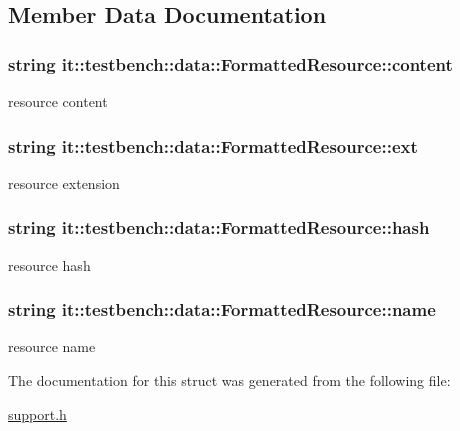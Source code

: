 \subsection{Member Data Documentation}
\hypertarget{structit_1_1testbench_1_1data_1_1FormattedResource_a911f5361ebeec67555aaafa516e0a666}{
\subsubsection[{content}]{\setlength{\rightskip}{0pt plus 5cm}string it\-::testbench\-::data\-::\-Formatted\-Resource\-::content}}\label{d6/d64/structit_1_1testbench_1_1data_1_1FormattedResource_a911f5361ebeec67555aaafa516e0a666}
resource content \hypertarget{structit_1_1testbench_1_1data_1_1FormattedResource_a59578a9c7075439bb47d4f2262ecf71b}{
\subsubsection[{ext}]{\setlength{\rightskip}{0pt plus 5cm}string it\-::testbench\-::data\-::\-Formatted\-Resource\-::ext}}\label{d6/d64/structit_1_1testbench_1_1data_1_1FormattedResource_a59578a9c7075439bb47d4f2262ecf71b}
resource extension \hypertarget{structit_1_1testbench_1_1data_1_1FormattedResource_aef2dc570d20d23972359bcd7bbc8b74e}{
\subsubsection[{hash}]{\setlength{\rightskip}{0pt plus 5cm}string it\-::testbench\-::data\-::\-Formatted\-Resource\-::hash}}\label{d6/d64/structit_1_1testbench_1_1data_1_1FormattedResource_aef2dc570d20d23972359bcd7bbc8b74e}
resource hash \hypertarget{structit_1_1testbench_1_1data_1_1FormattedResource_a42c6eb1cc1f6eef3df854e766aec346c}{
\subsubsection[{name}]{\setlength{\rightskip}{0pt plus 5cm}string it\-::testbench\-::data\-::\-Formatted\-Resource\-::name}}\label{d6/d64/structit_1_1testbench_1_1data_1_1FormattedResource_a42c6eb1cc1f6eef3df854e766aec346c}
resource name 

The documentation for this struct was generated from the following file\-:\begin{DoxyCompactItemize}
\item 
\hyperlink{support_8h}{support.\-h}\end{DoxyCompactItemize}
